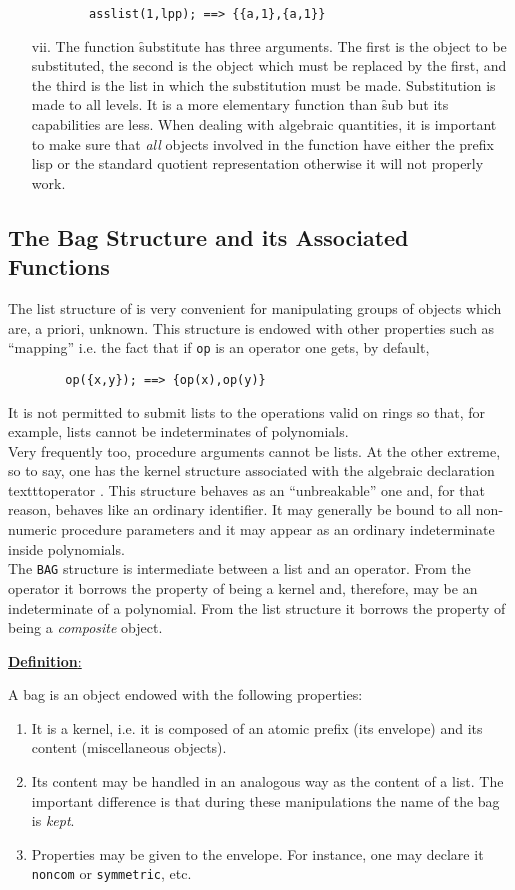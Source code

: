 \begin{itemize}
\begin{verbatim}
        asslist(1,lpp); ==> {{a,1},{a,1}}
\end{verbatim}
\item[vii.]
\hypertarget{operator:SUBSTITUTE}{}
The function \f{substitute} has three arguments. The first
is the object to be substituted, the second is the object which must be
replaced by the first, and the third is the list in which the substitution 
must be made. Substitution is made to
all levels. It is a more elementary function than \f{sub} but its
capabilities are less. When dealing with algebraic quantities, it is
important to make sure that \emph{all} objects involved in the function
have either the prefix lisp or the standard quotient representation
otherwise it will not properly work.
\end{itemize}
\subsection{ The Bag Structure and its Associated Functions}
The list structure of \REDUCE is very convenient for manipulating
groups of objects which are, a priori, unknown. This structure is
endowed with other properties such as ``mapping'' i.e. the fact that
if \texttt{op} is an operator one gets, by default,
\begin{verbatim}
        op({x,y}); ==> {op(x),op(y)}
\end{verbatim}
It is not permitted to submit lists to the operations valid on rings
so that, for example, lists cannot be indeterminates of polynomials.\\
Very frequently too, procedure arguments cannot be lists.
At the other extreme, so to say, one has the kernel
structure associated
with the algebraic declaration \\texttt{operator} .  This structure behaves as
an ``unbreakable'' one and, for that reason, behaves
like an ordinary identifier.
It may generally be bound to all non-numeric procedure parameters
and it may appear
as an ordinary indeterminate inside polynomials. \\
The \texttt{BAG} structure is intermediate between a list and an operator.
From the operator it borrows the property of being a kernel and,
therefore, may be an indeterminate of a polynomial. From the list structure
it borrows the property of being a \emph{composite} object.

\underline{\textbf{Definition}:}

A bag is an object endowed with the following properties:
\begin{enumerate}
\item It is a kernel, i.e. it is composed of an atomic prefix (its
envelope) and
its content (miscellaneous objects).
\item Its content may be handled in an analogous way as the content of a
list. The important difference is that during these manipulations 
the name of the bag is \emph{kept}.
\item Properties may be given to the envelope. For instance, one may
declare it \texttt{noncom} or \texttt{symmetric}, etc.
\end{enumerate}

